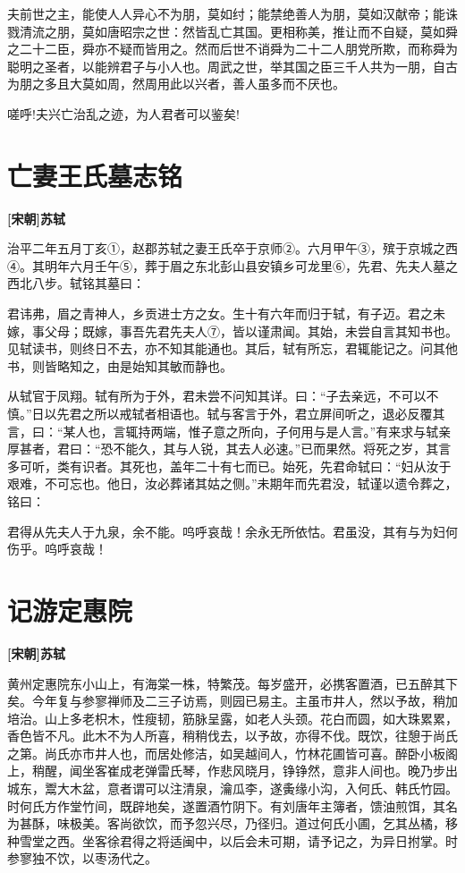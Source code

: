 \documentclass[UTF8,titlepage,oneside]{ctexbook}
\begin{document}
夫前世之主，能使人人异心不为朋，莫如纣；能禁绝善人为朋，莫如汉献帝；能诛戮清流之朋，莫如唐昭宗之世：然皆乱亡其国。更相称美，推让而不自疑，莫如舜之二十二臣，舜亦不疑而皆用之。然而后世不诮舜为二十二人朋党所欺，而称舜为聪明之圣者，以能辨君子与小人也。周武之世，举其国之臣三千人共为一朋，自古为朋之多且大莫如周，然周用此以兴者，善人虽多而不厌也。


嗟呼!夫兴亡治乱之迹，为人君者可以鉴矣!



\chapter*{亡妻王氏墓志铭}
\begin{center}
	\textbf{[宋朝]苏轼}
\end{center}

治平二年五月丁亥①，赵郡苏轼之妻王氏卒于京师②。六月甲午③，殡于京城之西④。其明年六月壬午⑤，葬于眉之东北彭山县安镇乡可龙里⑥，先君、先夫人墓之西北八步。轼铭其墓曰：


君讳弗，眉之青神人，乡贡进士方之女。生十有六年而归于轼，有子迈。君之未嫁，事父母；既嫁，事吾先君先夫人⑦，皆以谨肃闻。其始，未尝自言其知书也。见轼读书，则终日不去，亦不知其能通也。其后，轼有所忘，君辄能记之。问其他书，则皆略知之，由是始知其敏而静也。


从轼官于凤翔。轼有所为于外，君未尝不问知其详。曰：“子去亲远，不可以不慎。”日以先君之所以戒轼者相语也。轼与客言于外，君立屏间听之，退必反覆其言，曰：“某人也，言辄持两端，惟子意之所向，子何用与是人言。”有来求与轼亲厚甚者，君曰：“恐不能久，其与人锐，其去人必速。”已而果然。将死之岁，其言多可听，类有识者。其死也，盖年二十有七而已。始死，先君命轼曰：“妇从汝于艰难，不可忘也。他日，汝必葬诸其姑之侧。”未期年而先君没，轼谨以遗令葬之，铭曰：


君得从先夫人于九泉，余不能。呜呼哀哉！余永无所依怙。君虽没，其有与为妇何伤乎。呜呼哀哉！



\chapter*{记游定惠院}
\begin{center}
	\textbf{[宋朝]苏轼}
\end{center}

黄州定惠院东小山上，有海棠一株，特繁茂。每岁盛开，必携客置酒，已五醉其下矣。今年复与参寥禅师及二三子访焉，则园已易主。主虽市井人，然以予故，稍加培治。山上多老枳木，性瘦韧，筋脉呈露，如老人头颈。花白而圆，如大珠累累，香色皆不凡。此木不为人所喜，稍稍伐去，以予故，亦得不伐。既饮，往憩于尚氏之第。尚氏亦市井人也，而居处修洁，如吴越间人，竹林花圃皆可喜。醉卧小板阁上，稍醒，闻坐客崔成老弹雷氏琴，作悲风晓月，铮铮然，意非人间也。晚乃步出城东，鬻大木盆，意者谓可以注清泉，瀹瓜李，遂夤缘小沟，入何氏、韩氏竹园。时何氏方作堂竹间，既辟地矣，遂置酒竹阴下。有刘唐年主簿者，馈油煎饵，其名为甚酥，味极美。客尚欲饮，而予忽兴尽，乃径归。道过何氏小圃，乞其丛橘，移种雪堂之西。坐客徐君得之将适闽中，以后会未可期，请予记之，为异日拊掌。时参寥独不饮，以枣汤代之。
\end{document}
